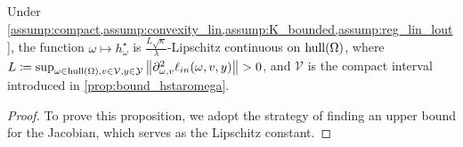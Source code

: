 \begin{proposition}\label{prop:lip_hstaromega}
Under \cref{assump:compact,assump:convexity_lin,assump:K_bounded,assump:reg_lin_lout}, the function $\omega\mapsto h^\star_\omega$ is $\frac{L\sqrt{\kappa}}{\lambda}$-Lipschitz continuous on $\textnormal{hull}(\Omega)$, where $L\coloneqq\sup_{\omega\in \textnormal{hull}(\Omega),v\in\mathcal{V},y\in\mathcal{Y}}\left\|\partial_{\omega, v}^2 \ell_{in}(\omega, v, y)\right\|>0$,   and $\mathcal{V}$ is the compact interval introduced in \cref{prop:bound_hstaromega}.
\end{proposition}
\begin{proof}
To prove this proposition, we adopt the strategy of finding an upper bound for the Jacobian, which serves as the Lipschitz constant. 


\end{proof}
